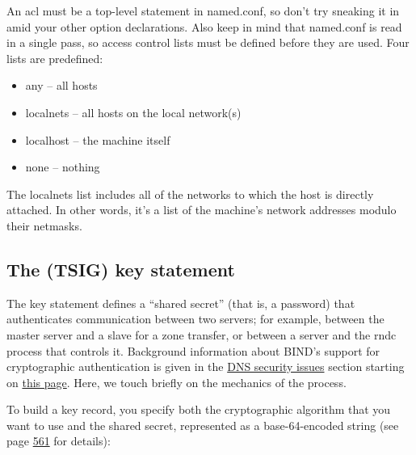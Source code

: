 An {acl} must be a top-level statement in {named.conf}, so don't try
sneaking it in amid your other option declarations. Also keep in mind
that {named.conf} is read in a single pass, so access control lists must
be defined before they are used. Four lists are predefined:

\begin{itemize}
\item
  {any} -- all hosts
\item
  {localnets }-- all hosts on the local network(s)
\item
  {localhost }-- the machine itself
\item
  {none} -- nothing
\end{itemize}

The {localnets} list includes all of the networks to which the host is
directly attached. In other words, it's a list of the machine's network
addresses modulo their netmasks.

\protect\hypertarget{part0024_split_039.html}{}{}

\hypertarget{part0024_split_039.htmlux5cux23_idContainer1069}{}
\hypertarget{part0024_split_039.htmlux5cux23calibre_pb_38}{%
\subsection[The (TSIG) {key}
statement]{\texorpdfstring{\protect\hypertarget{part0024_split_039.htmlux5cux23_idTextAnchor905}{}{}The
(TSIG) {key}
statement}{The (TSIG) key statement}}\label{part0024_split_039.htmlux5cux23calibre_pb_38}}

\protect\hypertarget{part0024_split_039.htmlux5cux23_idIndexMarker2179}{}{}The
{key} statement defines a ``shared secret'' (that is, a password) that
authenticates communication between two servers; for example, between
the master server and a slave for a zone transfer, or between a server
and the {rndc} process that controls it. Background information about
BIND's support for cryptographic authentication is given in the
\protect\hyperlink{part0024_split_053.htmlux5cux23_idTextAnchor931}{{DNS
security issues}} section starting on
\protect\hyperlink{part0024_split_053.htmlux5cux23_idTextAnchor931}{this
page}. Here, we touch briefly on the mechanics of the process.

To build a key record, you specify both the cryptographic algorithm that
you want to use and the shared secret, represented as a base-64-encoded
string (see page
\protect\hyperlink{part0024_split_057.htmlux5cux23_idTextAnchor936}{561}
for details):

